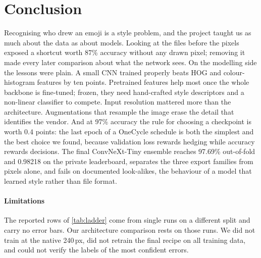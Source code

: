 \documentclass[11pt,a4paper]{article}
\newcommand{\pct}[1]{#1\%}
\begin{document}
\section{Conclusion}
\label{sec:conclusion}
Recognising who drew an emoji is a style problem, and the project taught us as much about the data as about models. Looking at the files before the pixels exposed a shortcut worth \pct{87} accuracy without any drawn pixel; removing it made every later comparison about what the network sees. On the modelling side the lessons were plain. A small CNN trained properly beats HOG and colour-histogram features by ten points. Pretrained features help most once the whole backbone is fine-tuned; frozen, they need hand-crafted style descriptors and a non-linear classifier to compete. Input resolution mattered more than the architecture. Augmentations that resample the image erase the detail that identifies the vendor. And at \pct{97} accuracy the rule for choosing a checkpoint is worth 0.4 points: the last epoch of a OneCycle schedule is both the simplest and the best choice we found, because validation loss rewards hedging while accuracy rewards decisions. The final ConvNeXt-Tiny ensemble reaches \pct{97.69} out-of-fold and 0.98218 on the private leaderboard, separates the three export families from pixels alone, and fails on documented look-alikes, the behaviour of a model that learned style rather than file format.

\paragraph{Limitations} The reported rows of \cref{tab:ladder} come from single runs on a different split and carry no error bars. Our architecture comparison rests on those runs. We did not train at the native 240\,px, did not retrain the final recipe on all training data, and could not verify the labels of the most confident errors.
\end{document}
